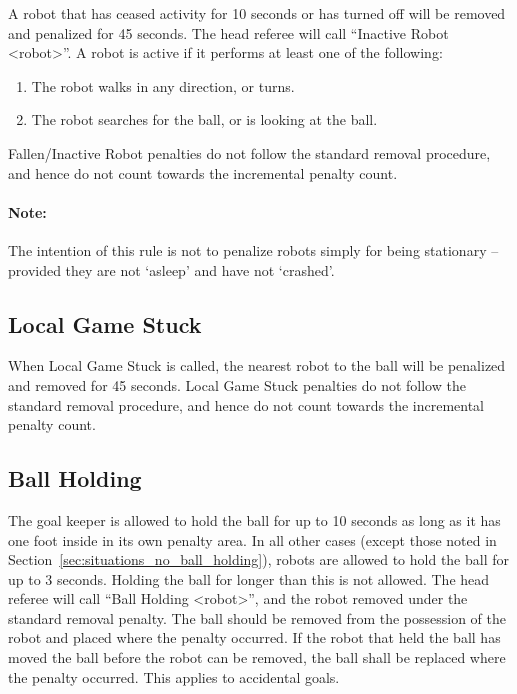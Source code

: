 \documentclass[12pt]{article}
\begin{document}
A robot that has ceased activity for 10 seconds or has turned off will be removed and penalized for 45 seconds.
The head referee will call ``Inactive Robot  \textless robot\textgreater''.
A robot is active if it performs at least one of the following:
\begin{enumerate}
  \item The robot walks in any direction, or turns.
  \item The robot searches for the ball, or is looking at the ball.
\end{enumerate}

Fallen/Inactive Robot penalties do not follow the standard removal procedure, and hence do not count towards the incremental penalty count.

\paragraph{Note:} The intention of this rule is not to penalize robots simply for being stationary -- provided they are not `asleep' and have not `crashed'.

\subsection{Local Game Stuck}
\label{sec:pen_local_game_stuck}

When Local Game Stuck is called, the nearest robot to the ball will be penalized and removed for 45 seconds. Local Game Stuck penalties do not follow the standard removal procedure, and hence do not count towards the incremental penalty count.


\subsection{Ball Holding}
\label{sec:ball_holding}

The goal keeper is allowed to hold the ball for up to 10 seconds as long as it has one foot inside in its own penalty area.  In all other cases (except those noted in Section~\ref{sec:situations_no_ball_holding}), robots are allowed to hold the ball for up to 3 seconds. Holding the ball for longer than this is not allowed.
The head referee will call ``Ball Holding \textless robot\textgreater'', and the robot removed under the standard removal penalty.
The ball should be removed from the possession of the robot and placed where the penalty occurred.
If the robot that held the ball has moved the ball before the robot can be removed, the ball shall be replaced where the penalty occurred.
This applies to accidental goals.
\end{document}
